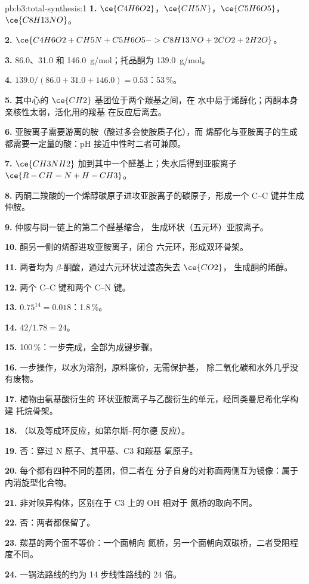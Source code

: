 \begin{solution}{pb:b3:total-synthesis:1}
\textbf{1.} $\ce{C4H6O2}$，$\ce{CH5N}$，$\ce{C5H6O5}$，$\ce{C8H13NO}$。

\textbf{2.} $\ce{C4H6O2 + CH5N + C5H6O5 -> C8H13NO + 2CO2 + 2H2O}$。

\textbf{3.} 86.0、31.0 和 \qty{146.0}{g/mol}；托品酮为 \qty{139.0}{g/mol}。

\textbf{4.} $139.0/(86.0 + 31.0 + 146.0) = 0.53$：53\,\%。

\textbf{5.} 其中心的 $\ce{CH2}$ 基团位于两个羰基之间，在
水中易于烯醇化；丙酮本身亲核性太弱，活化用的羧基
在反应后离去。

\textbf{6.} 亚胺离子需要游离的胺（酸过多会使胺质子化），而
烯醇化与亚胺离子的生成都需要一定量的酸：pH 接近中性时二者可兼顾。

\textbf{7.} $\ce{CH3NH2}$ 加到其中一个醛基上；失水后得到亚胺离子
$\ce{R-CH=N+H-CH3}$。

\textbf{8.} 丙酮二羧酸的一个烯醇碳原子进攻亚胺离子的碳原子，形成一个
C--C 键并生成仲胺。

\textbf{9.} 仲胺与同一链上的第二个醛基缩合，
生成环状（五元环）亚胺离子。

\textbf{10.} 酮另一侧的烯醇进攻亚胺离子，闭合
六元环，形成双环骨架。

\textbf{11.} 两者均为 $\beta$-酮酸，通过六元环状过渡态失去 $\ce{CO2}$，
生成酮的烯醇。

\textbf{12.} 两个 C--C 键和两个 C--N 键。

\textbf{13.} $0.75^{14} = 0.018$：1.8\,\%。

\textbf{14.} $42/1.78 = 24$。

\textbf{15.} 100\,\%：一步完成，全部为成键步骤。

\textbf{16.} 一步操作，以水为溶剂，原料廉价，无需保护基，
除二氧化碳和水外几乎没有废物。

\textbf{17.} 植物由氨基酸衍生的
环状亚胺离子与乙酸衍生的单元，经同类曼尼希化学构建
托烷骨架。

\textbf{18.} （以及等成环反应，如第尔斯–阿尔德
反应）。

\textbf{19.} 否：穿过 N 原子、其甲基、C3 和羰基
氧原子。

\textbf{20.} 每个都有四种不同的基团，但二者在
分子自身的对称面两侧互为镜像：属于内消旋型化合物。

\textbf{21.} 非对映异构体，区别在于 C3 上的 OH 相对于
氮桥的取向不同。

\textbf{22.} 否：两者都保留了。

\textbf{23.} 羰基的两个面不等价：一个面朝向
氮桥，另一个面朝向双碳桥，二者受阻程度不同。

\textbf{24.} 一锅法路线的约为 14 步线性路线的
24 倍。
\end{solution}
